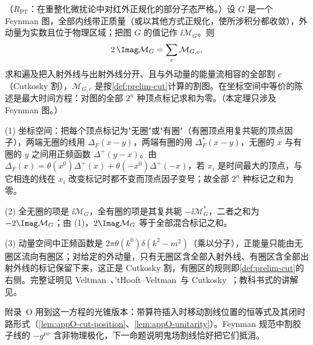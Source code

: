 \begin{theorem}\label{thm:prelim-cutting-rules}
（$R_{\mathrm{PT}}$：在重整化微扰论中对红外正规化的部分子态严格。）设 $G$ 是一个 Feynman 图，全部内线带正质量（或以其他方式正规化，使所涉积分都收敛），外动量为实数且位于物理区域；把图 $G$ 的值记作 $\ii\mathcal M_G$。则
\begin{equation}\label{eq:prelim-cutting}
2\,\Imag\mathcal M_G=\sum_{c}\mathcal M_{G,c},
\end{equation}
求和遍及把入射外线与出射外线分开、且与外动量的能量流相容的全部割 $c$（Cutkosky 割），$\mathcal M_{G,c}$ 是按\cref{def:prelim-cut}计算的割图。在坐标空间中等价的陈述是最大时间方程：对图的全部 $2^n$ 种顶点标记求和为零。（本定理只涉及 Feynman 图。）
\end{theorem}

\begin{proofsketch}
(1) 坐标空间：把每个顶点标记为"无圈"或"有圈"（有圈顶点用复共轭的顶点因子），两端无圈的线用 $\Delta_F(x-y)$，两端有圈的用 $\Delta_F^*(x-y)$，无圈的 $x$ 与有圈的 $y$ 之间用正频函数 $\Delta^+(y-x)$。由 $\Delta_F(x)=\theta(x^0)\Delta^+(x)+\theta(-x^0)\Delta^+(-x)$，若 $x_i$ 是时间最大的顶点，与它相连的线在 $x_i$ 改变标记时都不变而顶点因子变号；故全部 $2^n$ 种标记之和为零。

(2) 全无圈的项是 $\ii\mathcal M_G$，全有圈的项是其复共轭 $-\ii\mathcal M_G^*$，二者之和为 $-2\Imag\mathcal M_G$；由 (1)，$2\Imag\mathcal M_G$ 等于全部混合标记之和。

(3) 动量空间中正频函数是 $2\pi\theta(k^0)\delta(k^2-m^2)$（乘以分子），正能量只能由无圈区流向有圈区；对给定的外动量，只有无圈区含全部入射外线、有圈区含全部出射外线的标记保留下来，这正是 Cutkosky 割，有圈区的规则即\cref{def:prelim-cut}的右侧。完整证明见 Veltman~\cite{Veltman1963}、'tHooft--Veltman~\cite{tHooftVeltman1974}与 Cutkosky~\cite{Cutkosky1960}；教科书式的讲解见\cite[第~7.3~节]{PeskinSchroeder1995}。
\end{proofsketch}

附录~O 用到这一方程的光锥版本：带算符插入时移动割线位置的恒等式及其闭时路形式（\cref{lem:appO-cut-position}、\cref{lem:appO-unitarity}）。Feynman 规范中割胶子线的 $-g^{\mu\nu}$ 含非物理极化，下一命题说明鬼场割线恰好把它们抵消。

